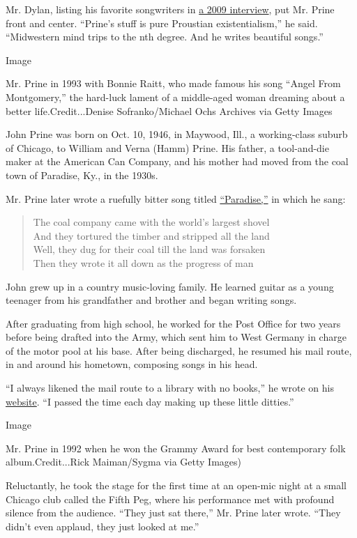 Mr. Dylan, listing his favorite songwriters in
\href{https://www.huffpost.com/entry/bob-dylan-exclusive-inter_n_187216}{a
2009 interview}, put Mr. Prine front and center. ``Prine's stuff is pure
Proustian existentialism,'' he said. ``Midwestern mind trips to the nth
degree. And he writes beautiful songs.''

Image

Mr. Prine in 1993 with Bonnie Raitt, who made famous his song ``Angel
From Montgomery,'' the hard-luck lament of a middle-aged woman dreaming
about a better life.Credit...Denise Sofranko/Michael Ochs Archives via
Getty Images

John Prine was born on Oct. 10, 1946, in Maywood, Ill., a working-class
suburb of Chicago, to William and Verna (Hamm) Prine. His father, a
tool-and-die maker at the American Can Company, and his mother had moved
from the coal town of Paradise, Ky., in the 1930s.

Mr. Prine later wrote a ruefully bitter song titled
\href{https://www.youtube.com/watch?v=ediaZ5DhYjw}{``Paradise,''} in
which he sang:

\begin{quote}
The coal company came with the world's largest shovel\\
And they tortured the timber and stripped all the land\\
Well, they dug for their coal till the land was forsaken\\
Then they wrote it all down as the progress of man
\end{quote}

John grew up in a country music-loving family. He learned guitar as a
young teenager from his grandfather and brother and began writing songs.

After graduating from high school, he worked for the Post Office for two
years before being drafted into the Army, which sent him to West Germany
in charge of the motor pool at his base. After being discharged, he
resumed his mail route, in and around his hometown, composing songs in
his head.

``I always likened the mail route to a library with no books,'' he wrote
on his \href{http://johnprine.net/}{website}. ``I passed the time each
day making up these little ditties.''

Image

Mr. Prine in 1992 when he won the Grammy Award for best contemporary
folk album.Credit...Rick Maiman/Sygma via Getty Images)

Reluctantly, he took the stage for the first time at an open-mic night
at a small Chicago club called the Fifth Peg, where his performance met
with profound silence from the audience. ``They just sat there,'' Mr.
Prine later wrote. ``They didn't even applaud, they just looked at me.''

